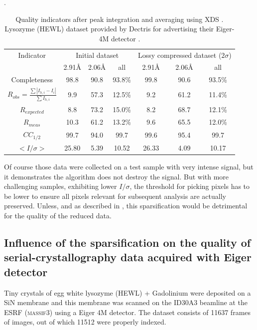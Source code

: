 \documentclass[preprint]{iucr}              %
\begin{document}
\begin{table}
\label{xds_summary}
\caption{Quality indicators after peak integration and averaging using XDS \cite{xds}. 
Lysozyme (HEWL) dataset provided by Dectris for advertising their Eiger-4M detector \cite{lysozyme}.}.
\begin{tabular}{|c|c c c|c c c|} 
\hline
Indicator & \multicolumn{3}{c|}{Initial dataset} & \multicolumn{3}{c|}{Lossy compressed dataset ($2\sigma$)} \\ 
          & 2.91\AA & 2.06\AA & all & 2.91\AA & 2.06\AA & all \\
\hline
Completeness                                        & 98.8& 90.8 & 93.8\% & 99.8& 90.6 & 93.5\% \\ 
$R_{obs}=\frac{\sum |I_{h,i}-I_{i}|}{\sum I_{h,i}}$ & 9.9 & 57.3& 12.5\% & 9.2 & 61.2&  11.4\%\\ 
$R_{expected}$                                      & 8.8 & 73.2& 15.0\% & 8.2 & 68.7 &  12.1\%\\
$R_{meas}$ \cite{Rmeas}  &10.3 &61.2& 13.2\% & 9.6 & 65.5 & 12.0\%\\
$CC_{1/2}$ \cite{cc1/2}  & 99.7 &94.0 & 99.7   & 99.6 & 95.4 & 99.7  \\
$<I/\sigma>$               & 25.80 & 5.39 & 10.52  & 26.33& 4.09 & 10.17 \\
\hline
\end{tabular}
\end{table}
Of course those data were collected on a test sample with very intense signal, but it demonstrates the algorithm does not destroy the signal. 
But with more challenging samples, exhibiting lower $I/\sigma$, the threshold for picking pixels has to be lower to ensure all pixels relevant for subsequent analysis are actually preserved. 
Unless, and as described in , this sparsification would be detrimental for the quality of the reduced data.

\subsection{Influence of the sparsification on the quality of serial-crystallography data acquired with Eiger detector}
\label{nicolas} %

Tiny crystals of egg white lysozyme (HEWL) + Gadolinium were deposited on a SiN membrane and this membrane was scanned on the ID30A3 beamline at the ESRF (\textsc{massif}3) using a Eiger 4M detector.
The dataset consists of 11637 frames of  images, out of which 11512 were properly indexed. 
\end{document}
